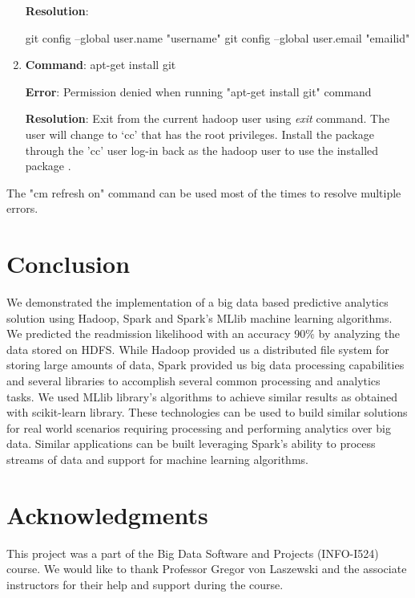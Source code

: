 \documentclass[9pt,twocolumn,twoside]{../../styles/osajnl}
\begin{document}
\begin{enumerate}
 \textbf{Resolution}: 
 
 git config --global user.name "username"
 git config --global user.email "emailid"
 

 \item \textbf{Command}: apt-get install git
 
 \textbf{Error}: Permission denied when running "apt-get install git" command
 
 \textbf{Resolution}: Exit from the current hadoop user using \textit{exit} command. The user will change to ‘cc’ that has the root privileges. Install  the package through the 'cc' user log-in back as the hadoop user to use the installed package .
\end{enumerate}

The "cm refresh on" command can be used most of the times to resolve multiple errors.









    
    

\section{Conclusion}
We demonstrated the implementation of a big data based  predictive analytics solution using Hadoop, Spark and Spark’s MLlib machine learning algorithms. We predicted the readmission likelihood with an accuracy 90$\%$ by analyzing the data stored on HDFS.  While Hadoop provided us a distributed file system for storing large amounts of data, Spark provided us big data processing capabilities and several libraries to accomplish several common processing and analytics tasks. We used MLlib library’s algorithms to achieve similar results as obtained with scikit-learn library. These technologies can be used to build similar solutions for real world scenarios requiring processing and performing analytics over big data.  Similar applications can be built leveraging   Spark’s ability to process streams of data and support for machine learning algorithms. 

\section{Acknowledgments}
This project was a part of the Big Data Software and Projects (INFO-I524) course. We would like to thank Professor Gregor von Laszewski and the associate instructors for their help and support during the course. 


\end{document}
